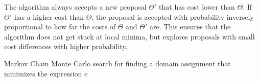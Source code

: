 The algorithm always accepts a new proposal $\Theta'$
that has cost lower than $\Theta$. If $\Theta'$ has a 
higher cost than $\Theta$, the proposal is
accepted with probability inversely proportional to
how far the costs of $\Theta$ and $\Theta'$ are. This ensures that 
the algorithm does not get stuck at local minima, but 
explores proposals with small cost differences with 
higher probability.

\iffull
\begin{algorithm}[t]
	\caption{Markov Chain Monte Carlo search for  finding a
	domain assignment that minimizes the expression $e$}
	\label{dcsyn}
	\begin{algorithmic}[1] \label{alg:mcmc}
		\EndWhile
		\EndProcedure
		
%		
	\end{algorithmic}
\end{algorithm}
\fi


